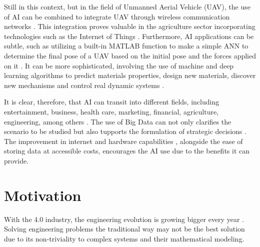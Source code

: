 Still in this context, but in the field of Unmanned Aerial Vehicle (UAV), the use of AI can be combined to integrate UAV through wireless communication networks \cite{lahmeri2021}. This integration proves valuable in the agriculture sector \cite{ahirwar2019} incorporating technologies such as the Internet of Things \cite{verdouw2016,tzounis2017}.
Furthermore, AI applications can be subtle, such as utilizing a built-in MATLAB function to make a simple ANN to determine the final pose of a UAV based on the initial pose and the forces applied on it \cite{geronel2023}. It can be more sophisticated, involving the use of machine and deep learning algorithms to predict materials properties, design new materials, discover new mechanisms and control real dynamic systems \cite{guo2021,assilian1974}.

It is clear, therefore, that AI can transit into different fields, including entertainment, business, health care, marketing, financial, agriculture, engineering, among others \cite{ruiz-real2020,yu2018,davenport2019,verma2021,mhlanga2020,pannu2015,ghatrehsamani2023}. 
The use of Big Data can not only clarifies the scenario to be studied but also tupports the formulation of strategic decisions \cite{jeble2018,koscielniak2015}.
The improvement in internet and hardware capabilities \cite{baji2018}, alongside the ease of storing data at accessible costs, encourages the AI use due to the benefits it can provide.

\section{Motivation}

With the 4.0 industry, the engineering evolution is growing bigger every year \cite{meindl2021}.
Solving engineering problems the traditional way may not be the best solution due to its non-triviality to complex systems and their mathematical modeling.


